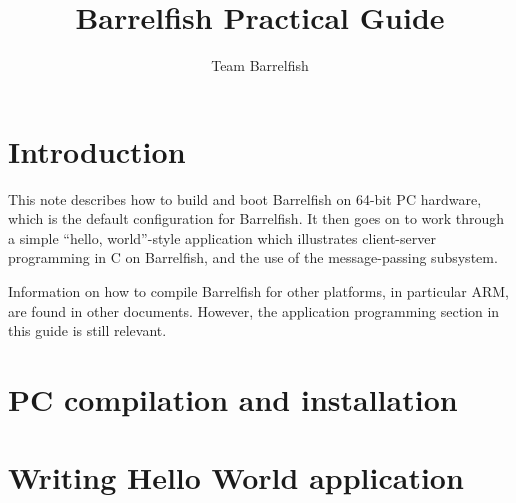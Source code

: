 \documentclass[a4paper,twoside]{report} %
\title{Barrelfish Practical Guide}   %
\author{Team Barrelfish}	%
\begin{document}
\maketitle

%
%
\begin{versionhistory}
\end{versionhistory}

\tableofcontents		%


\chapter{Introduction}

This note describes how to build and boot Barrelfish on 64-bit PC
hardware, which is the default configuration for Barrelfish.  It then
goes on to work through a simple ``hello, world''-style application
which illustrates client-server programming in C on Barrelfish, and
the use of the message-passing subsystem. 

Information on how to compile Barrelfish for other platforms, in
particular ARM, are found in other documents.  However, the
application programming section in this guide is still relevant. 

\chapter{PC compilation and installation}\label{chap:compilationInstallation}



\chapter{Writing Hello World application}\label{chap:helloWorldApp}




\end{document}
